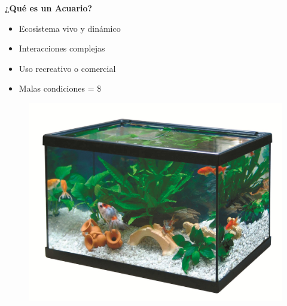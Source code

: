 \documentclass{beamer}
\begin{document}
\begin{frame}{\textbf{¿Qué es un Acuario?}}
\fontsize{14pt}{15}\selectfont
\begin{minipage}[c]{1.0\linewidth}
\begin{minipage}[c]{0.6\linewidth}
	\begin{itemize}
		\item Ecosistema vivo y dinámico 
		\vspace{10px}
		\item Interacciones complejas
		\vspace{10px}
		\item Uso recreativo o comercial
		\vspace{10px}
		\item Malas condiciones = \$
		\vspace{10px}
  	\end{itemize}	
  \end{minipage}
  \begin{minipage}[c]{0.35\linewidth}
	\begin{figure}[H]
		{\includegraphics[width=1\textwidth]{./imagenes/acuario.jpg}}
	\end{figure}	  	  	
  \end{minipage}
\end{minipage}
\end{frame}
\end{document}
